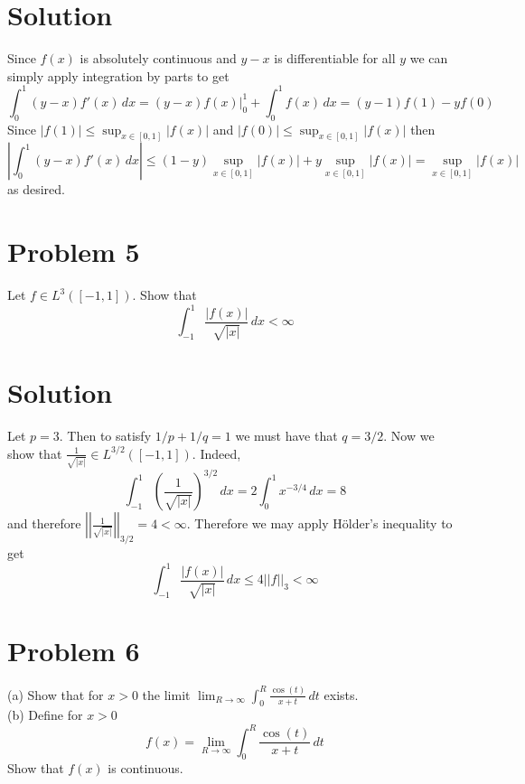 \documentclass{article}
\begin{document}
\section*{Solution}
Since $f(x)$ is absolutely continuous and $y-x$ is differentiable for all $y$ we can simply apply integration by parts to get
$$\int_0^1(y-x)f'(x)\,dx=(y-x)f(x)\Big|_0^1+\int_0^1f(x)\,dx=(y-1)f(1)-yf(0)$$
Since $|f(1)|\leq\sup_{x\in[0,1]}|f(x)|$ and $|f(0)|\leq\sup_{x\in[0,1]}|f(x)|$ then
$$\left|\int_0^1(y-x)f'(x)\,dx\right|\leq(1-y)\sup_{x\in[0,1]}|f(x)|+y\sup_{x\in[0,1]}|f(x)|=\sup_{x\in[0,1]}|f(x)|$$
as desired.
\section*{Problem 5}
Let $f\in L^3([-1,1])$. Show that
$$\int_{-1}^1\frac{|f(x)|}{\sqrt{|x|}}\,dx<\infty$$
\section*{Solution}
Let $p=3$. Then to satisfy $1/p+1/q=1$ we must have that $q=3/2$. Now we show that $\frac{1}{\sqrt{|x|}}\in L^{3/2}([-1,1])$. Indeed,
$$\int_{-1}^1\left(\frac{1}{\sqrt{|x|}}\right)^{3/2}\,dx=2\int_0^1x^{-3/4}\,dx=8$$
and therefore $\displaystyle\left|\left|\frac{1}{\sqrt{|x|}}\right|\right|_{3/2}=4<\infty$. Therefore we may apply H\"older's inequality to get
$$\int_{-1}^1\frac{|f(x)|}{\sqrt{|x|}}\,dx\leq4||f||_3<\infty$$
\section*{Problem 6}
(a) Show that for $x>0$ the limit $\lim_{R\to\infty}\int_0^R\frac{\cos(t)}{x+t}\,dt$ exists.\\
(b) Define for $x>0$ 
$$f(x)=\lim_{R\to\infty}\int_0^R\frac{\cos(t)}{x+t}\,dt$$
Show that $f(x)$ is continuous.
\end{document}
